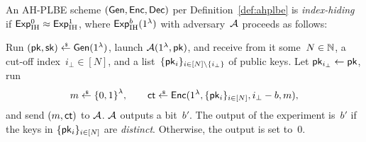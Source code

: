 \begin{definition}\label{def:ahplbe-index-hiding}
An AH-PLBE scheme $({\smash{\mathsf{Gen}}},{\smash{\mathsf{Enc}}},{\smash{\mathsf{Dec}}})$ per Definition~\ref{def:ahplbe}
is \emph{index-hiding} if ${{\smash{\mathsf{Exp}}_{\textup{IH}}^{0}}\approx{\smash{\mathsf{Exp}}_{\textup{IH}}^{1}}}$,
where ${\smash{\mathsf{Exp}}_{\textup{IH}}^{b}}(1^\lambda)$ with adversary~${\mathcal{A}}$ proceeds as follows:
\begin{security}
Run
${(\pk,\sk)\draws\Gen(1^\lambda)}$,
launch ${\mathcal{A}}(1^\lambda,{\smash{\mathsf{pk}}})$, and
receive from it
some~${N\in{\mathbb{N}}}$,
a cut-off index~${i_\bot\in[N]}$, and
a list~$\{\pk_i\}_{i\in[N]\setminus\{i_\bot\}}$ of public keys.
Let ${\pk_{i_\bot}\gets\pk}$,
run
\begin{align*}
m\draws\bit^\lambda,\qquad
\ct\draws\Enc(1^\lambda,\{\pk_i\}_{i\in[N]},i_\bot-b,m),
\end{align*}
and send $(m,{\smash{\mathsf{ct}}})$ to ${\mathcal{A}}$.
${\mathcal{A}}$ outputs a bit~$b'$.
The output of the experiment is~$b'$ if
the keys in $\{{\smash{\mathsf{pk}}}_i\}_{i\in[N]}$ are \emph{distinct}.
Otherwise, the output is set to~$0$.
\end{security}
\end{definition}
